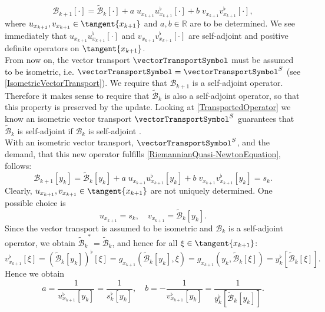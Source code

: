 \begin{equation*}
    \mathcal{B}_{k+1} [\cdot] = \widetilde{\mathcal{B}}_k [\cdot] + a \; u_{x_{k+1}}u^{\flat}_{x_{k+1}} [\cdot] + b \; v_{x_{k+1}}v^{\flat}_{x_{k+1}} [\cdot],
\end{equation*}
where $u_{x_{k+1}}, v_{x_{k+1}} \in \tangent{x_{k+1}}$ and $a, b \in \mathbb{R}$ are to be determined. We see immediately that $u_{x_{k+1}}u^{\flat}_{x_{k+1}} [\cdot]$ and $v_{x_{k+1}}v^{\flat}_{x_{k+1}} [\cdot]$ are self-adjoint and positive definite operators on $\tangent{x_{k+1}}$. \\
From now on, the vector transport $\vectorTransportSymbol$ must be assumed to be isometric, i.e. $\vectorTransportSymbol = \vectorTransportSymbol^S$ (see \cref{IsometricVectorTransport}). We require that $\mathcal{B}_{k+1}$ is a self-adjoint operator. Therefore it makes sense to require that $\widetilde{\mathcal{B}}_k$ is also a self-adjoint operator, so that this property is preserved by the update. Looking at \cref{TransportedOperator} we know an isometric vector transport $\vectorTransportSymbol^S$ guarantees that $\widetilde{\mathcal{B}}_k$ is self-adjoint if $\mathcal{B}_k$ is self-adjoint \cite[p.~20]{Huang:2013}. \\
With an isometric vector transport, $\vectorTransportSymbol^S$, and the demand, that this new operator fulfills \cref{RiemannianQuasi-NewtonEquation}, follows:
\begin{equation*}
    \mathcal{B}_{k+1} [y_k] = \widetilde{\mathcal{B}}_k [y_k] + a \; u_{x_{k+1}}u^{\flat}_{x_{k+1}}[y_k] + b \; v_{x_{k+1}}v^{\flat}_{x_{k+1}}[y_k] = s_k.
\end{equation*}
Clearly, $u_{x_{k+1}}, v_{x_{k+1}} \in \tangent{x_{k+1}}$ are not uniquely determined. One possible choice is
\begin{equation*}
    u_{x_{k+1}} = s_k, \quad v_{x_{k+1}} = \widetilde{\mathcal{B}}_k [y_k].
\end{equation*}
Since the vector transport is assumed to be isometric and $\mathcal{B}_k$ is a self-adjoint operator, we obtain ${\widetilde{\mathcal{B}}_k}^* = \widetilde{\mathcal{B}}_k$, and hence for all $\xi \in \tangent{x_{k+1}}$:
\begin{equation*}
    v^{\flat}_{x_{k+1}}[\xi] = (\widetilde{\mathcal{B}}_k [y_k])^{\flat}[\xi] = g_{x_{k+1}}(\widetilde{\mathcal{B}}_k [y_k], \xi) = g_{x_{k+1}}(y_k, \widetilde{\mathcal{B}}_k [\xi]) = y^{\flat}_k [\widetilde{\mathcal{B}}_k [\xi]].
\end{equation*}
Hence we obtain
\begin{equation*}
    a = \frac{1}{u^{\flat}_{x_{k+1}} [y_k]} = \frac{1}{s^{\flat}_k [y_k]}, \quad b = - \frac{1}{v^{\flat}_{x_{k+1}} [y_k]} = \frac{1}{y^{\flat}_k [\widetilde{\mathcal{B}}_k [y_k]]}.
\end{equation*}
